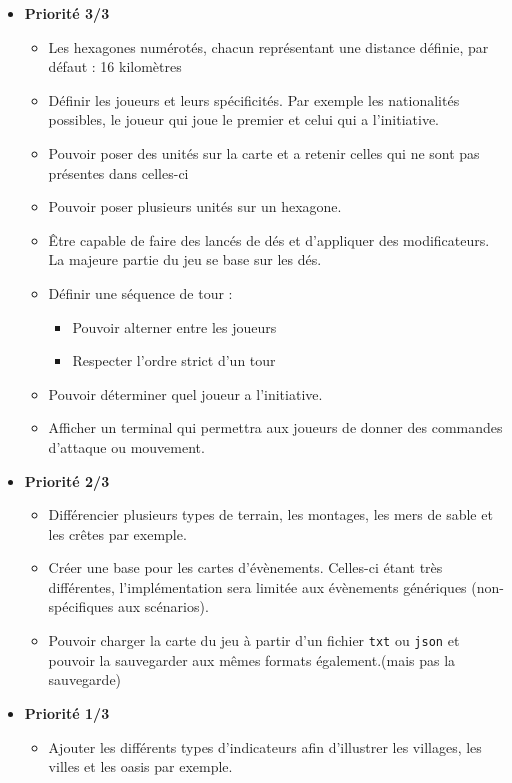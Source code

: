 \begin{itemize}
    \item \textbf{Priorité 3/3}
    \begin{itemize}
        \item Les hexagones numérotés, chacun représentant une distance définie, par défaut : 16 kilomètres \cmark
        \item Définir les joueurs et leurs spécificités. Par exemple les nationalités possibles, le joueur 
qui joue le premier et celui qui a l’initiative.\cmark
        \item Pouvoir poser des unités sur la carte et a retenir celles qui ne sont pas présentes dans
celles-ci \cmark
        \item Pouvoir poser plusieurs unités sur un hexagone.\cmark
        \item Être capable de faire des lancés de dés et d’appliquer des modificateurs. La majeure partie
du jeu se base sur les dés.\xmark
        \item Définir une séquence de tour :
        \begin{itemize}
            \item Pouvoir alterner entre les joueurs \cmark
            \item Respecter l’ordre strict d’un tour \cmark
        \end{itemize}
        \item Pouvoir déterminer quel joueur a l’initiative.
        \item Afficher un terminal qui permettra aux joueurs de donner des commandes d'attaque ou mouvement.\cmark
    \end{itemize}
    \item \textbf{Priorité 2/3}
    \begin{itemize}
        \item Différencier plusieurs types de terrain, les montages, les mers de sable et les crêtes
par exemple.\cmark
        \item Créer une base pour les cartes d’évènements. Celles-ci étant très différentes, l’implémentation sera limitée aux évènements génériques (non-spécifiques aux scénarios).\cmark
        \item Pouvoir charger la carte du jeu à partir d’un fichier \lstinline{txt} ou \lstinline{json} et pouvoir la sauvegarder
aux mêmes formats également.\cmark (mais pas la sauvegarde)
    \end{itemize}
    \item \textbf{Priorité 1/3}
    \begin{itemize}
        \item Ajouter les différents types d’indicateurs afin d’illustrer les villages, les villes et les
oasis par exemple. \cmark
    \end{itemize}
\end{itemize}

